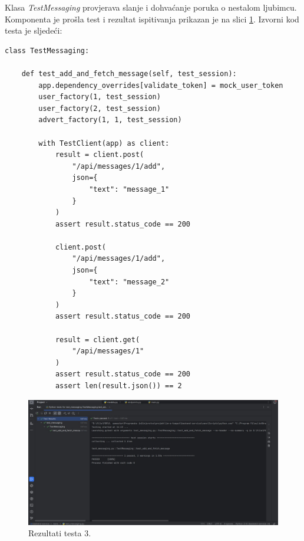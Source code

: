 			Klasa \textit{TestMessaging} provjerava slanje i dohvaćanje poruka o nestalom ljubimcu. Komponenta je prošla test i rezultat ispitivanja prikazan je na slici \ref{fig:test3}. Izvorni kod testa je sljedeći:
			\begin{lstlisting}
class TestMessaging:

    def test_add_and_fetch_message(self, test_session):
        app.dependency_overrides[validate_token] = mock_user_token
        user_factory(1, test_session)
        user_factory(2, test_session)
        advert_factory(1, 1, test_session)

        with TestClient(app) as client:
            result = client.post(
                "/api/messages/1/add",
                json={
                    "text": "message_1"
                }
            )
            assert result.status_code == 200

            client.post(
                "/api/messages/1/add",
                json={
                    "text": "message_2"
                }
            )
            assert result.status_code == 200

            result = client.get(
                "/api/messages/1"
            )
            assert result.status_code == 200
            assert len(result.json()) == 2
			\end{lstlisting}

			\begin{figure}[H]
			 	\includegraphics[scale=0.42]{slike/test3.jpg} %
			 	\centering
			 	\caption{Rezultati testa 3.}
			 	\label{fig:test3}
			 \end{figure}

